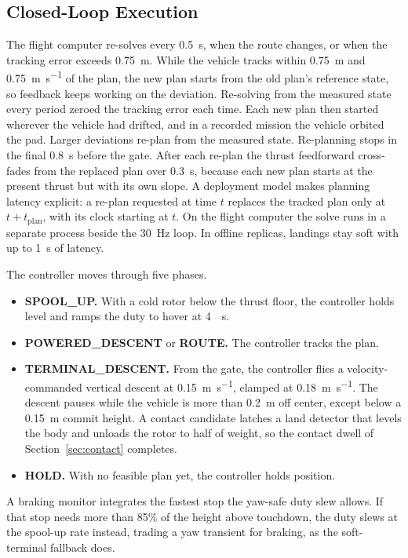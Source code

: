 \documentclass[journal]{IEEEtran}
\newcommand{\refsec}[1]{Section~\ref{#1}}
\begin{document}
\subsection{Closed-Loop Execution}
\label{sec:closedloop}

The flight computer re-solves every \SI{0.5}{\second}, when the route changes, or when the tracking error exceeds \SI{0.75}{\metre}.
While the vehicle tracks within \SI{0.75}{\metre} and \SI{0.75}{\metre\per\second} of the plan, the new plan starts from the old plan's reference state, so feedback keeps working on the deviation.
Re-solving from the measured state every period zeroed the tracking error each time.
Each new plan then started wherever the vehicle had drifted, and in a recorded mission the vehicle orbited the pad.
Larger deviations re-plan from the measured state.
Re-planning stops in the final \SI{0.8}{\second} before the gate.
After each re-plan the thrust feedforward cross-fades from the replaced plan over \SI{0.3}{\second}, because each new plan starts at the present thrust but with its own slope.
A deployment model makes planning latency explicit: a re-plan requested at time $t$ replaces the tracked plan only at $t + t_{\text{plan}}$, with its clock starting at $t$.
On the flight computer the solve runs in a separate process beside the \SI{30}{\hertz} loop.
In offline replicas, landings stay soft with up to \SI{1}{\second} of latency.

The controller moves through five phases.
\begin{itemize}
\item \textbf{SPOOL\_UP.} With a cold rotor below the thrust floor, the controller holds level and ramps the duty to hover at \SI{4}{\per\second}.
\item \textbf{POWERED\_DESCENT} or \textbf{ROUTE.} The controller tracks the plan.
\item \textbf{TERMINAL\_DESCENT.} From the gate, the controller flies a velocity-commanded vertical descent at \SI{0.15}{\metre\per\second}, clamped at \SI{0.18}{\metre\per\second}.
The descent pauses while the vehicle is more than \SI{0.2}{\metre} off center, except below a \SI{0.15}{\metre} commit height.
A contact candidate latches a land detector that levels the body and unloads the rotor to half of weight, so the contact dwell of \refsec{sec:contact} completes.
\item \textbf{HOLD.} With no feasible plan yet, the controller holds position.
\end{itemize}
A braking monitor integrates the fastest stop the yaw-safe duty slew allows.
If that stop needs more than 85\% of the height above touchdown, the duty slews at the spool-up rate instead, trading a yaw transient for braking, as the soft-terminal fallback does.
\end{document}
